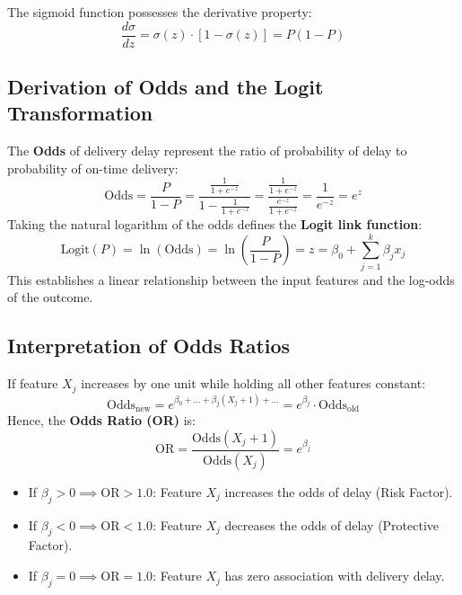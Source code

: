 \documentclass[11pt,a4paper]{article}
\begin{document}
The sigmoid function possesses the derivative property:
\begin{equation}
    \frac{d\sigma}{dz} = \sigma(z) \cdot [1 - \sigma(z)] = P(1 - P)
    \label{eq:sigmoid_deriv}
\end{equation}

\subsection{Derivation of Odds and the Logit Transformation}
The \textbf{Odds} of delivery delay represent the ratio of probability of delay to probability of on-time delivery:
\begin{equation}
    \text{Odds} = \frac{P}{1 - P} = \frac{\frac{1}{1 + e^{-z}}}{1 - \frac{1}{1 + e^{-z}}} = \frac{\frac{1}{1 + e^{-z}}}{\frac{e^{-z}}{1 + e^{-z}}} = \frac{1}{e^{-z}} = e^z
\end{equation}
Taking the natural logarithm of the odds defines the \textbf{Logit link function}:
\begin{equation}
    \text{Logit}(P) = \ln(\text{Odds}) = \ln\left(\frac{P}{1 - P}\right) = z = \beta_0 + \sum_{j=1}^k \beta_j x_j
\end{equation}
This establishes a linear relationship between the input features and the log-odds of the outcome.

\subsection{Interpretation of Odds Ratios}
If feature $X_j$ increases by one unit while holding all other features constant:
\begin{equation}
    \text{Odds}_{\text{new}} = e^{\beta_0 + \dots + \beta_j(X_j + 1) + \dots} = e^{\beta_j} \cdot \text{Odds}_{\text{old}}
\end{equation}
Hence, the \textbf{Odds Ratio (OR)} is:
\begin{equation}
    \text{OR} = \frac{\text{Odds}(X_j + 1)}{\text{Odds}(X_j)} = e^{\beta_j}
\end{equation}
\begin{itemize}[noitemsep]
    \item If $\beta_j > 0 \implies \text{OR} > 1.0$: Feature $X_j$ increases the odds of delay (Risk Factor).
    \item If $\beta_j < 0 \implies \text{OR} < 1.0$: Feature $X_j$ decreases the odds of delay (Protective Factor).
    \item If $\beta_j = 0 \implies \text{OR} = 1.0$: Feature $X_j$ has zero association with delivery delay.
\end{itemize}
\end{document}
